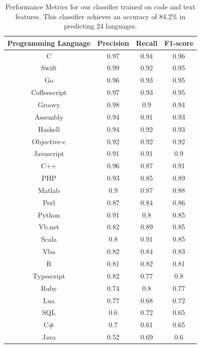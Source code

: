 \documentclass[letterpaper, 10 pt, conference]{ieeeconf}  %
\begin{document}
\begin{table}[t]
  \centering
  \begin{tabular}{| c | c | c | c |}
     \hline
      Programming Language & Precision & Recall  & F1-score \\ \hline
C	&0.97&	0.94	&0.96	 \\ \hline
Swift	&0.99	&0.92&	0.95	\\ \hline
Go	&0.96&	0.93	&0.95	\\ \hline
Coffeescript&	0.97	&0.93	&0.95	\\ \hline
Groovy&	0.98	&0.9	&0.94	\\ \hline
Assembly	&0.94	&0.91	&0.93\\ \hline
Haskell	&0.94&	0.92&	0.93	\\ \hline
Objective-c	&0.92	&0.92&	0.92\\ \hline
Javascript&	0.91&	0.91&	0.9\\ \hline
C++&	0.96	&0.87&	0.91\\ \hline
PHP	&0.93&	0.85&	0.89	\\ \hline
Matlab	&0.9&	0.87	&0.88\\ \hline
Perl	&0.87&	0.84	&0.86\\ \hline
Python&	0.91&	0.8&	0.85\\ \hline
Vb.net	&0.82	&0.89&	0.85\\ \hline
Scala	&0.8&	0.91&	0.85\\ \hline
Vba	&0.82	&0.84&	0.83\\ \hline	
R	&0.81&	0.82&	0.81\\ \hline	
Typescript	&0.82	&0.77	&0.8\\ \hline
Ruby	&0.74	&0.8&	0.77	\\ \hline
Lua	&0.77	&0.68&	0.72	\\ \hline
SQL&	0.6	&0.72&	0.65\\ \hline
C\#	&0.7	&0.61	&0.65\\ \hline
Java&	0.52&	0.69	&0.6	\\ \hline
  \end{tabular}
  \caption{Performance Metrics for our classifier trained on code and text features. This classifier achieves an accuracy of 84.2\% in predicting 24 languages.}
  \label{Table:COdeText}%
\end{table}
\bigbreak
\end{document}
